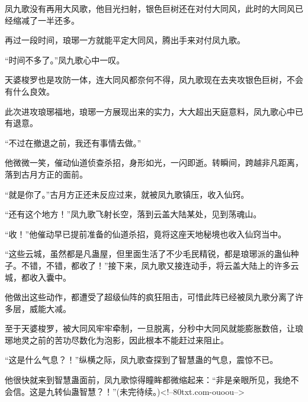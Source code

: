 \begin{this_body}
凤九歌没有再用大风歌，他目光扫射，银色巨树还在对付大同风，此时的大同风已经缩减了一半还多。

再过一段时间，琅琊一方就能平定大同风，腾出手来对付凤九歌。

“时间不多了。”凤九歌心中一叹。

天婆梭罗也是攻防一体，连大同风都奈何不得，凤九歌现在去夹攻银色巨树，不会有什么良效。

此次进攻琅琊福地，琅琊一方展现出来的实力，大大超出天庭意料，凤九歌心中已有退意。

“不过在撤退之前，我还有事情去做。”

他微微一笑，催动仙道侦查杀招，身形如光，一闪即逝。转瞬间，跨越非凡距离，落到古月方正的面前。

“就是你了。”古月方正还未反应过来，就被凤九歌镇压，收入仙窍。

“还有这个地方！”凤九歌飞射长空，落到云盖大陆某处，见到荡魂山。

“收！”他催动早已提前准备的仙道杀招，竟将这座天地秘境也收入仙窍当中。

“这些云城，虽然都是凡蛊屋，但里面生活了不少毛民精锐，都是琅琊派的蛊仙种子。不错，不错，都收了！”接下来，凤九歌又接连动手，将云盖大陆上的许多云城，都收入囊中。

他做出这些动作，都遭受了超级仙阵的疯狂阻击，可惜此阵已经被凤九歌分离了许多层，威能大减。

至于天婆梭罗，被大同风牢牢牵制，一旦脱离，分秒中大同风就能膨胀数倍，让琅琊地灵之前的苦功尽数化为泡影，因此根本不能赶过来阻止。

“这是什么气息？！”纵横之际，凤九歌查探到了智慧蛊的气息，震惊不已。

他很快就来到智慧蛊面前，凤九歌惊得瞳眸都微缩起来：“非是亲眼所见，我绝不会信。这是九转仙蛊智慧？！”(未完待续。)<!--80txt.com-ouoou-->

\end{this_body}

